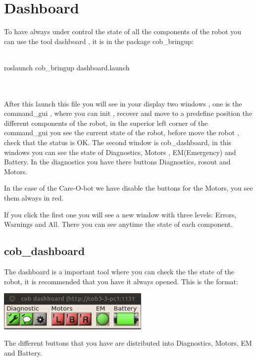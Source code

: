 \section{Dashboard}
To have always under control the state of all the components of the robot you can use the tool dashboard , it is in the package cob\_bringup:
\\
\\   \colorbox{light-gray}{
         \begin{minipage}{1.0\textwidth} 
		roslaunch cob\_bringup dashboard.launch
         \end{minipage}  } \\
	\\
After this launch this file you will see in your display two windows , one is the command\_gui , where you can init , recover and move to a predefine position the different components of the robot, in the superior left corner of the command\_gui you see the current state of the robot, before move the robot , check that the status is OK. The second window is cob\_dashboard, in this windows you can see the state of Diagnostics, Motors , EM(Emergency) and Battery. In the diagnostics you have there buttons Diagnostics, rosout and Motors. 

In the case of the Care-O-bot we have disable the buttons for the Motors, you see them always in red. 

If you click the first one you will see a new window with three levels: Errors, Warnings and All. There you can see anytime the state of each component. 

\subsection {cob\_dashboard}

The dashboard is a important tool where you can check the the state of the robot, it is recommended that you have it always opened. This is the format:
\\
\begin{center}
 \includegraphics[width=0.55\textwidth]{images/dashboard.png}
 \end{center}
The different buttons that you have are distributed into Diagnostics, Motors, EM and Battery.

